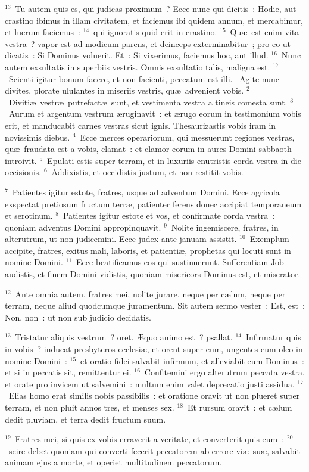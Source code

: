 ${}^{13}$~Tu autem quis es, qui judicas proximum~? Ecce nunc qui dicitis~: Hodie, aut crastino ibimus in illam civitatem, et faciemus ibi quidem annum, et mercabimur, et lucrum faciemus~:
${}^{14}$~qui ignoratis quid erit in crastino.
${}^{15}$~Qu\ae\ est enim vita vestra~? vapor est ad modicum parens, et deinceps exterminabitur~; pro eo ut dicatis~: Si Dominus voluerit. Et~: Si vixerimus, faciemus hoc, aut illud.
${}^{16}$~Nunc autem exsultatis in superbiis vestris. Omnis exsultatio talis, maligna est.
${}^{17}$~Scienti igitur bonum facere, et non facienti, peccatum est illi.
~\lettrine[lines=10,image=true,loversize=0.05,lraise=-0.03]{A}{}gite nunc divites, plorate ululantes in miseriis vestris, qu\ae\ advenient vobis.
${}^{2}$~Diviti\ae\ vestr\ae\ putrefact\ae\ sunt, et vestimenta vestra a tineis comesta sunt.
${}^{3}$~Aurum et argentum vestrum \ae ruginavit~: et \ae rugo eorum in testimonium vobis erit, et manducabit carnes vestras sicut ignis. Thesaurizastis vobis iram in novissimis diebus.
${}^{4}$~Ecce merces operariorum, qui messuerunt regiones vestras, qu\ae\ fraudata est a vobis, clamat~: et clamor eorum in aures Domini sabbaoth introivit.
${}^{5}$~Epulati estis super terram, et in luxuriis enutristis corda vestra in die occisionis.
${}^{6}$~Addixistis, et occidistis justum, et non restitit vobis.


${}^{7}$~Patientes igitur estote, fratres, usque ad adventum Domini. Ecce agricola exspectat pretiosum fructum terr\ae , patienter ferens donec accipiat temporaneum et serotinum.
${}^{8}$~Patientes igitur estote et vos, et confirmate corda vestra~: quoniam adventus Domini appropinquavit.
${}^{9}$~Nolite ingemiscere, fratres, in alterutrum, ut non judicemini. Ecce judex ante januam assistit.
${}^{10}$~Exemplum accipite, fratres, exitus mali, laboris, et patienti\ae , prophetas qui locuti sunt in nomine Domini.
${}^{11}$~Ecce beatificamus eos qui sustinuerunt. Sufferentiam Job audistis, et finem Domini vidistis, quoniam misericors Dominus est, et miserator.


${}^{12}$~Ante omnia autem, fratres mei, nolite jurare, neque per c\ae lum, neque per terram, neque aliud quodcumque juramentum. Sit autem sermo vester~: Est, est~: Non, non~: ut non sub judicio decidatis.


${}^{13}$~Tristatur aliquis vestrum~? oret. \AE quo animo est~? psallat.
${}^{14}$~Infirmatur quis in vobis~? inducat presbyteros ecclesi\ae , et orent super eum, ungentes eum oleo in nomine Domini~:
${}^{15}$~et oratio fidei salvabit infirmum, et alleviabit eum Dominus~: et si in peccatis sit, remittentur ei.
${}^{16}$~Confitemini ergo alterutrum peccata vestra, et orate pro invicem ut salvemini~: multum enim valet deprecatio justi assidua.
${}^{17}$~Elias homo erat similis nobis passibilis~: et oratione oravit ut non plueret super terram, et non pluit annos tres, et menses sex.
${}^{18}$~Et rursum oravit~: et c\ae lum dedit pluviam, et terra dedit fructum suum.


${}^{19}$~Fratres mei, si quis ex vobis erraverit a veritate, et converterit quis eum~:
${}^{20}$~scire debet quoniam qui converti fecerit peccatorem ab errore vi\ae\ su\ae , salvabit animam ejus a morte, et operiet multitudinem peccatorum.
